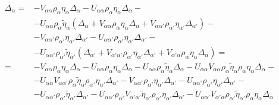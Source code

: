 \documentclass[class=article, crop=false]{standalone}
\begin{document}
\begin{equation}\label{key}
	\begin{split}
		\Delta_{ \alpha} = & - V_{ \alpha \alpha} \rho_{ \alpha} \eta_{ \alpha} \Delta_{ \alpha} - U_{ \alpha \alpha} \rho_{ \alpha} \eta_{ \alpha} \Delta_{ \alpha} - \\
		& - U_{ \alpha \alpha} \rho_{ \alpha} \tilde{ \eta}_{ \alpha} ( \Delta_{ \alpha} + V_{ \alpha \alpha} \rho_{ \alpha} \eta_{ \alpha} \Delta_{ \alpha} + V_{ \alpha \alpha'} \rho_{ \alpha'} \eta_{ \alpha'} \Delta_{ \alpha'}) - \\
		& - V_{ \alpha \alpha'} \rho_{ \alpha'} \eta_{ \alpha'} \Delta_{ \alpha'} - U_{ \alpha \alpha'} \rho_{ \alpha'} \eta_{ \alpha'} \Delta_{ \alpha'} - \\
		& - U_{ \alpha \alpha'} \rho_{ \alpha'} \tilde{ \eta}_{ \alpha'} ( \Delta_{ \alpha'} + V_{ \alpha' \alpha'} \rho_{ \alpha'} \eta_{ \alpha'} \Delta_{ \alpha'} + V_{ \alpha' \alpha} \rho_{ \alpha} \eta_{ \alpha} \Delta_{ \alpha}) = \\
		= & - V_{ \alpha \alpha} \rho_{ \alpha} \eta_{ \alpha} \Delta_{ \alpha} - U_{ \alpha \alpha} \rho_{ \alpha} \eta_{ \alpha} \Delta_{ \alpha} - U_{ \alpha \alpha} \rho_{ \alpha} \tilde{ \eta}_{ \alpha} \Delta_{ \alpha} - U_{ \alpha \alpha} V_{ \alpha \alpha} \rho_{ \alpha} \tilde{ \eta}_{ \alpha} \rho_{ \alpha} \eta_{ \alpha} \Delta_{ \alpha} - \\
		& - U_{ \alpha \alpha} V_{ \alpha \alpha'} \rho_{ \alpha} \tilde{ \eta}_{ \alpha} \rho_{ \alpha'} \eta_{ \alpha'} \Delta_{ \alpha'} - V_{ \alpha \alpha'} \rho_{ \alpha'} \eta_{ \alpha'} \Delta_{ \alpha'} - U_{ \alpha \alpha'} \rho_{ \alpha'} \eta_{ \alpha'} \Delta_{ \alpha'} - \\
		& - U_{ \alpha \alpha'} \rho_{ \alpha'} \tilde{ \eta}_{ \alpha'} \Delta_{ \alpha'} - U_{ \alpha \alpha'} \rho_{ \alpha'} V_{ \alpha' \alpha'} \tilde{ \eta}_{ \alpha'} \rho_{ \alpha'} \eta_{ \alpha'} \Delta_{ \alpha'} - U_{ \alpha \alpha'} V_{ \alpha' \alpha} \rho_{ \alpha'} \tilde{ \eta}_{ \alpha'} \rho_{ \alpha} \eta_{ \alpha} \Delta_{ \alpha}
	\end{split}
\end{equation}
\end{document}
